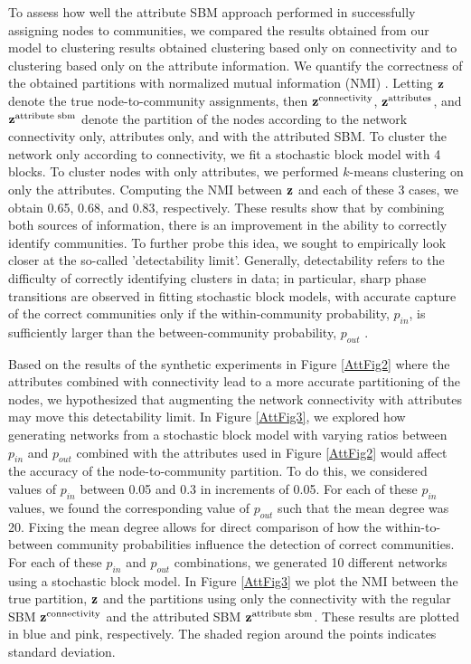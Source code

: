 To assess how well the attribute SBM approach performed in successfully assigning nodes to communities, we compared the results obtained from our model to clustering results obtained clustering based only on connectivity and to clustering based only on the attribute information. We quantify the correctness of the obtained partitions with normalized mutual information (NMI) \cite{commdeccompare}. Letting ${\bf z}$ denote the true node-to-community assignments, then ${\bf z}^{\text{connectivity}}$, ${\bf z}^{\text{attributes}}$, and ${\bf z}^{\text{attribute sbm}}$ denote the partition of the nodes according to the network connectivity only, attributes only, and with the attributed SBM. To cluster the network only according to connectivity, we fit a stochastic block model with 4 blocks. To cluster nodes with only attributes, we performed $k$-means clustering on only the attributes. Computing the NMI between ${\bf z}$ and each of these 3 cases, we obtain 0.65, 0.68, and 0.83, respectively. 
These results show that by combining both sources of information, there is an improvement in the ability to correctly identify communities. To further probe this idea, we sought to empirically look closer at the so-called 'detectability limit'. Generally, detectability refers to the difficulty of correctly identifying clusters in data; in particular, sharp phase transitions are observed in fitting stochastic block models, with accurate capture of the correct communities only if the within-community probability, $p_{in}$, is sufficiently larger than the between-community probability, $p_{out}$ \cite{decelle2011inference,taylor2015enhanced}. 

Based on the results of the synthetic experiments in Figure \ref{AttFig2} where the attributes combined with connectivity lead to a more accurate partitioning of the nodes, we hypothesized that augmenting the network connectivity with attributes may move this detectability limit. In Figure \ref{AttFig3}, we explored how generating networks from a stochastic block model with varying ratios between $p_{in}$ and $p_{out}$ combined with the attributes used in Figure \ref{AttFig2} would affect the accuracy of the node-to-community partition. To do this, we considered values of $p_{in}$ between 0.05 and 0.3 in increments of 0.05. For each of these $p_{in}$ values, we found the corresponding value of $p_{out}$ such that the mean degree was 20. Fixing the mean degree allows for direct comparison of how the within-to-between community probabilities influence the detection of correct communities. For each of these $p_{in}$ and $p_{out}$ combinations, we generated 10 different networks using a stochastic block model. In Figure \ref{AttFig3} we plot the NMI between the true partition, ${\bf z}$ and the partitions using only the connectivity with the regular SBM ${\bf z}^{\text{connectivity}}$ and the attributed SBM ${\bf z}^{\text{attribute sbm}}$. These results are plotted in blue and pink, respectively. The shaded region around the points indicates standard deviation. 

